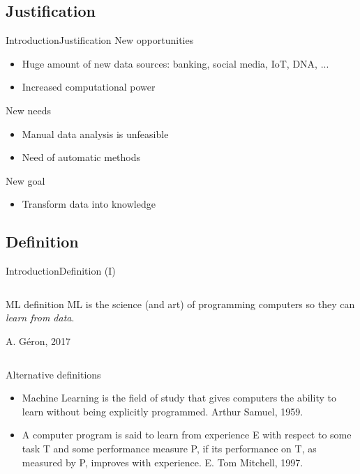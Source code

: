 \documentclass[10pt,compress]{beamer} %
\begin{document}
\subsection{Justification}
\begin{frame}{Introduction}{Justification}
	 New opportunities
	\begin{itemize}
	\item Huge amount of new data sources: banking, social media, IoT, DNA, ...
	\item Increased computational power
	\end{itemize}
	New needs
	\begin{itemize}
	\item Manual data analysis is unfeasible
	\item Need of automatic methods
	\end{itemize}
	New goal
	\begin{itemize}
		\item Transform data into knowledge
	\end{itemize}
\end{frame}

\subsection{Definition}
\begin{frame}{Introduction}{Definition (I)}

	\begin{columns}
	   \begin{block}{ML definition}
		ML is the science (and art) of programming computers so they can \textit{learn from data}.

		\hfill A. G\'eron, 2017
		\end{block}
	\end{columns}

	\bigskip

	Alternative definitions
	\begin{itemize}
	\item Machine Learning is the field of study that gives computers the ability to learn without being explicitly programmed. Arthur Samuel, 1959.
	\item A computer program is said to learn from experience E with respect to some task T and some performance measure P, if its performance on T, as measured by P, improves with experience. E. Tom Mitchell, 1997.
	\end{itemize}
\end{frame}
\end{document}
